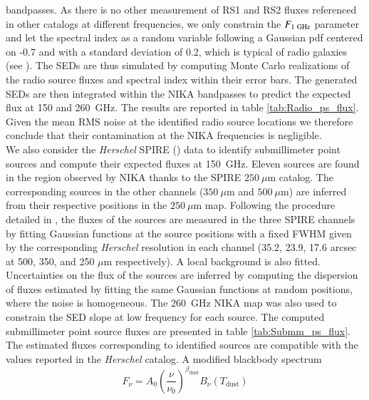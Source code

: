 \documentclass[traditabstract]{aa}
\begin{document}
bandpasses. As there is no other measurement of RS1 and RS2 fluxes referenced in other catalogs at different frequencies, we only constrain the $F_{\rm{1~GHz}}$ parameter and let the spectral index as a random variable following a Gaussian pdf centered on -0.7 and with a standard deviation of 0.2, which is typical of radio galaxies (see \citealt{spectral_index}). The SEDs are thus simulated by computing Monte Carlo realizations of the radio source fluxes and spectral index within their error bars. The generated SEDs are then integrated within the NIKA bandpasses to predict the expected flux at 150 and 260~GHz. The results are reported in table \ref{tab:Radio_ps_flux}. Given the mean RMS noise at the identified radio source locations we therefore conclude that their contamination at the NIKA frequencies is negligible.\\
\indent We also consider the {\it Herschel} SPIRE (\citealt{SPIRE}) data to identify submillimeter point sources and compute their expected fluxes at 150~GHz. Eleven sources are found in the region observed by NIKA thanks to the SPIRE $250~\mu$m catalog. The corresponding sources in the other channels ($350~\mu$m and $500~\mu$m) are inferred from their respective positions in the $250~\mu$m map. Following the procedure detailed in \citealt{MACSJ1424NIKA}, the fluxes of the sources are measured in the three SPIRE channels by fitting Gaussian functions at the source positions with a fixed FWHM given by the corresponding {\it Herschel} resolution in each channel (35.2, 23.9, 17.6 arcsec at 500, 350, and 250 $\mu$m respectively). A local background is also fitted. Uncertainties on the flux of the sources are inferred by computing the dispersion of fluxes estimated by fitting the same Gaussian functions at random positions, where the noise is homogeneous. The 260~GHz NIKA map was also used to constrain the SED slope at low frequency for each source. The computed submillimeter point source fluxes are presented in table \ref{tab:Submm_ps_flux}. The estimated fluxes corresponding to identified sources are compatible with the values reported in the {\it Herschel} catalog. A modified blackbody spectrum
\begin{equation}
F_{\nu} = A_0\left(\frac{\nu}{\nu_0}\right)^{\beta_{\mathrm{dust}}}B_{\nu}(T_{\mathrm{dust}})
\end{equation}
\end{document}
